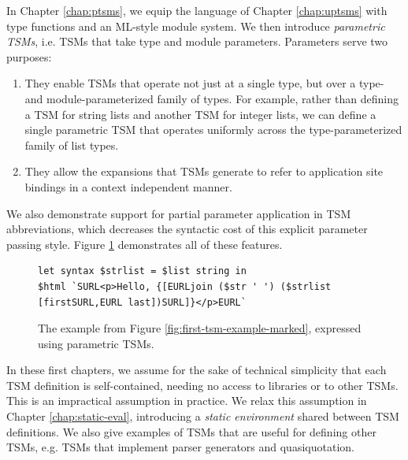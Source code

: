In Chapter \ref{chap:ptsms}, we equip the language of Chapter \ref{chap:uptsms} with type functions and an ML-style module system. We then introduce \emph{parametric TSMs}, i.e. TSMs that take type and module parameters. Parameters serve two purposes:
\begin{enumerate}
\item They enable TSMs that operate not just at a single type, but over a type- and module-parameterized family of types. For example, rather than defining a TSM  for string lists and another TSM  for integer lists, we can define a single parametric TSM  that operates uniformly across the type-parameterized family of list types. 
\item They allow the expansions that TSMs generate to refer to application site bindings in a context independent manner. 
\end{enumerate}
We also demonstrate support for partial parameter application in TSM abbreviations, which decreases the syntactic cost of this explicit parameter passing style. Figure \ref{fig:first-ptsm-example-marked} demonstrates all of these features.

\begin{figure}[h]
\begin{lstlisting}[numbers=none,xleftmargin=0px]
let syntax $strlist = $list string in 
$html `SURL<p>Hello, {[EURLjoin ($str ' ') ($strlist [firstSURL,EURL last])SURL]}</p>EURL`
\end{lstlisting}
\caption{The example from Figure \ref{fig:first-tsm-example-marked}, expressed using parametric TSMs.}
\label{fig:first-ptsm-example-marked}
\end{figure}

In these first chapters, we assume for the sake of technical simplicity that each TSM definition is self-contained, needing no access to libraries or to other TSMs. This is an impractical assumption in practice. We relax this assumption in Chapter \ref{chap:static-eval}, introducing a \emph{static environment} shared between TSM definitions. We also give examples of TSMs that are useful for defining other TSMs, e.g. TSMs that implement parser generators and quasiquotation.

